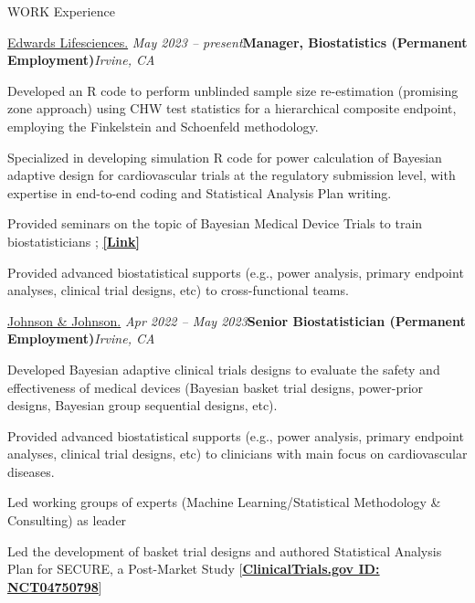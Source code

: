 \documentclass[
	11pt, %
]{resume} %
\begin{document}
\begin{rSection}{WORK Experience}

\begin{rSubsection}{
\href{https://www.edwards.com/}{Edwards Lifesciences.}
}{\em May 2023 -- present}{\textbf{Manager, Biostatistics (Permanent Employment)}}{\em Irvine, CA}
\item Developed an R code to perform unblinded sample size re-estimation (promising zone approach) using CHW test statistics for a hierarchical composite endpoint, employing the Finkelstein and Schoenfeld methodology.
\item Specialized in developing simulation R code for power calculation of Bayesian adaptive design for cardiovascular trials at the regulatory submission level, with expertise in end-to-end coding and Statistical Analysis Plan writing.
\item Provided seminars on the topic of Bayesian Medical Device Trials to train biostatisticians ; \href{https://drive.google.com/file/d/1pHxwp4T9Nq2EKNrlxqzy1VxmxcZAERH-/view}{\underline{\textbf{[Link]}}}
\item Provided advanced biostatistical supports (e.g., power analysis, primary endpoint analyses, clinical trial designs, etc) to cross-functional teams.
\end{rSubsection}


\begin{rSubsection}{
\href{https://www.jnjmedtech.com/en-US}{Johnson \& Johnson.}
}{\em Apr 2022 -- May 2023}{\textbf{Senior Biostatistician (Permanent Employment)}}{\em Irvine, CA}
\item Developed Bayesian adaptive clinical trials designs to evaluate the safety and effectiveness of medical devices (Bayesian basket trial designs, power-prior designs, Bayesian group sequential designs, etc).
\item Provided advanced biostatistical supports (e.g., power analysis, primary endpoint analyses, clinical trial designs, etc) to clinicians with main focus on cardiovascular diseases.
\item Led working groups of experts (Machine Learning/Statistical Methodology \& Consulting) as leader
\item Led the development of basket trial designs and authored Statistical Analysis Plan for SECURE, a Post-Market Study [\href{https://clinicaltrials.gov/ct2/show/NCT04750798}{\underline{\textbf{ClinicalTrials.gov ID: NCT04750798}}}]
\end{rSubsection}


\end{rSection}
\end{document}
